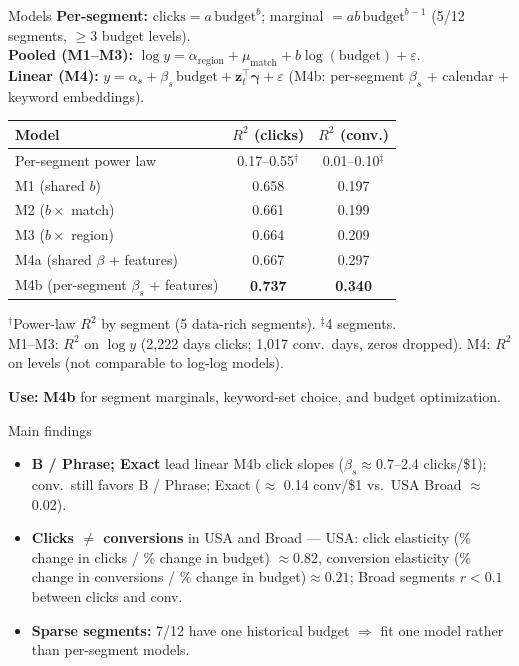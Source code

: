 \documentclass[11pt]{beamer}
\begin{document}
\begin{frame}{Models}
  \footnotesize
  \textbf{Per-segment:} $\text{clicks} = a\,\text{budget}^{b}$;\;
  marginal $= a b\,\text{budget}^{b-1}$ \;(5/12 segments, $\geq 3$ budget levels).\\
  \textbf{Pooled (M1--M3):} $\log y = \alpha_{\text{region}} + \mu_{\text{match}} + b\log(\text{budget}) + \varepsilon$.\\
  \textbf{Linear (M4):} $y = \alpha_s + \beta_s\,\text{budget} + \mathbf{z}_t^\top\boldsymbol{\gamma} + \varepsilon$
  \;(M4b: per-segment $\beta_s$ + calendar + keyword embeddings).

  \vspace{0.4em}
  \centering
  \begin{tabular}{lcc}
    \toprule
    Model & $R^2$ (clicks) & $R^2$ (conv.) \\
    \midrule
    Per-segment power law & 0.17--0.55$^\dagger$ & 0.01--0.10$^\ddagger$ \\
    M1 (shared $b$) & 0.658 & 0.197 \\
    M2 ($b \times$ match) & 0.661 & 0.199 \\
    M3 ($b \times$ region) & 0.664 & 0.209 \\
    M4a (shared $\beta$ + features) & 0.667 & 0.297 \\
    M4b (per-segment $\beta_s$ + features) & \textbf{0.737} & \textbf{0.340} \\
    \bottomrule
  \end{tabular}

  \vspace{0.25em}
  \raggedright
  {\scriptsize $^\dagger$Power-law $R^2$ by segment (5 data-rich segments). $^\ddagger$4 segments.\\
  M1--M3: $R^2$ on $\log y$ (2{,}222 days clicks; 1{,}017 conv.\ days, zeros dropped). M4: $R^2$ on levels (not comparable to log-log models).}

  \vspace{0.2em}
  \textbf{Use:} \textbf{M4b} for segment marginals, keyword-set choice, and budget optimization.
\end{frame}

\begin{frame}{Main findings}
  \begin{itemize}
    \item \textbf{B / Phrase; Exact} lead linear M4b click slopes ($\beta_s \approx 0.7$--2.4 clicks/\$1); conv.\ still favors B / Phrase; Exact ($\approx$ 0.14 conv/\$1 vs.\ USA Broad $\approx$ 0.02).
    \item \textbf{Clicks $\neq$ conversions} in USA and Broad --- USA: click elasticity (\% change in clicks / \% change in budget) $\approx 0.82$, conversion elasticity (\% change in conversions / \% change in budget)$\approx 0.21$; Broad segments $r < 0.1$ between clicks and conv.
    \item \textbf{Sparse segments:} 7/12 have one historical budget $\Rightarrow$ fit one model rather than per-segment models.
  \end{itemize}
\end{frame}
\end{document}
